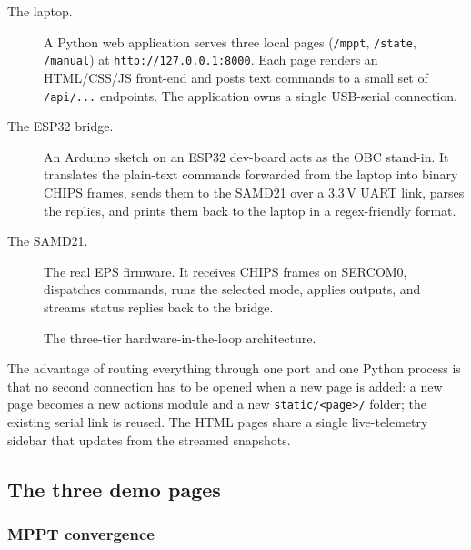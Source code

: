 \begin{description}
\item[The laptop.] A Python web application serves three local
pages (\texttt{/mppt}, \texttt{/state}, \texttt{/manual}) at
\texttt{http://127.0.0.1:8000}. Each page renders an HTML/CSS/JS
front-end and posts text commands to a small set of
\texttt{/api/...} endpoints. The application owns a single
USB-serial connection.

\item[The ESP32 bridge.] An Arduino sketch on an ESP32
dev-board acts as the OBC stand-in. It translates the plain-text
commands forwarded from the laptop into binary CHIPS frames, sends
them to the SAMD21 over a 3.3\,V UART link, parses the replies,
and prints them back to the laptop in a regex-friendly format.

\item[The SAMD21.] The real EPS firmware. It receives CHIPS frames
on SERCOM0, dispatches commands, runs the selected mode, applies
outputs, and streams status replies back to the bridge.
\end{description}

\begin{figure}[ht]
\centering
{}
\caption{The three-tier hardware-in-the-loop architecture.}
\label{fig:hil-architecture}
\end{figure}

The advantage of routing everything through one port and one
Python process is that no second connection has to be opened
when a new page is added: a new page becomes a new actions module
and a new \texttt{static/<page>/} folder; the existing serial
link is reused. The HTML pages share a single live-telemetry
sidebar that updates from the streamed snapshots.

\subsection{The three demo pages}

\subsubsection{MPPT convergence}

